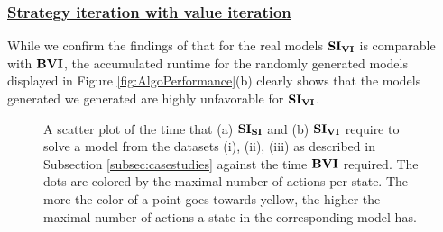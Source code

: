 \subsubsection*{\underline{Strategy iteration with value iteration}}
While we confirm the findings of \cite{gandalf} that for the real models $\SI$ is comparable with $\BVI$, 
the accumulated runtime for the randomly generated models displayed in Figure \ref{fig:AlgoPerformance}(b) clearly shows that 
the models generated we generated are highly unfavorable for $\SI$.

\begin{figure}[h!]
    \centering
    \caption[$\SI$ and $\SISI$ compared to $\BVI$ based on the maximal number of actions per state]{
        A scatter plot of the time that (a) $\SISI$ and (b) $\SI$ require to solve a model from the datasets (i), (ii), (iii) as described in Subsection \ref{subsec:casestudies} 
        against the time $\BVI$ required.
        The dots are colored by the maximal number of actions per state.
        The more the color of a point goes towards yellow, the higher the maximal number of actions a state in the corresponding model has.
    }
    \label{fig:colorScatterSi}
\end{figure}
